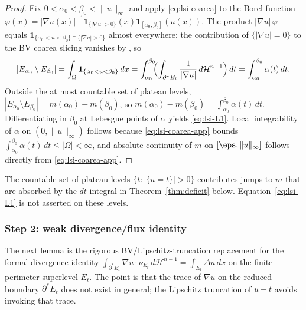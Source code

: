 \begin{proof}
Fix $0<\alpha_{0}<\beta_{0}<\|u\|_{\infty}$ and apply
\eqref{eq:lsi-coarea} to the Borel function
$\varphi(x)=|\nabla u(x)|^{-1}\mathbf 1_{\{|\nabla u|>0\}}(x)
\mathbf 1_{[\alpha_{0},\beta_{0}]}(u(x))$. The product
$|\nabla u|\,\varphi$ equals $\mathbf 1_{\{\alpha_{0}<u<\beta_{0}\}\cap\{|\nabla
u|>0\}}$ almost everywhere; the contribution of $\{|\nabla u|=0\}$ to
the BV coarea slicing vanishes by \cite[3.40(b)]{AFP2000}, so
\begin{equation}\label{eq:lsi-coarea-app}
   |E_{\alpha_{0}}\setminus E_{\beta_{0}}|
   =\int_{\Omega}\mathbf 1_{\{\alpha_{0}<u<\beta_{0}\}}\,dx
   =\int_{\alpha_{0}}^{\beta_{0}}\!\!\Bigl(\int_{\partial^{*}E_{t}}
     \frac{1}{|\nabla u|}\,d\mathcal H^{n-1}\Bigr)\,dt
   =\int_{\alpha_{0}}^{\beta_{0}}\alpha(t)\,dt.
\end{equation}
Outside the at most countable set of plateau levels,
$|E_{\alpha_{0}}\setminus E_{\beta_{0}}|=m(\alpha_{0})-m(\beta_{0})$, so
$m(\alpha_{0})-m(\beta_{0})=\int_{\alpha_{0}}^{\beta_{0}}\alpha(t)\,dt$.
Differentiating in $\beta_{0}$ at Lebesgue points of $\alpha$ yields
\eqref{eq:lsi-L1}. Local integrability of $\alpha$ on $(0,\|u\|_{\infty})$
follows because \eqref{eq:lsi-coarea-app} bounds
$\int_{\alpha_{0}}^{\beta_{0}}\alpha(t)\,dt\le |\Omega|<\infty$, and
absolute continuity of $m$ on $[\eps,\|u\|_{\infty}]$ follows directly
from \eqref{eq:lsi-coarea-app}.
\end{proof}

\begin{remark}\label{rem:plateaus}
The countable set of plateau levels $\{t:|\{u=t\}|>0\}$ contributes
jumps to $m$ that are absorbed by the $dt$-integral in
Theorem~\ref{thm:deficit} below. Equation~\eqref{eq:lsi-L1} is not
asserted on these levels.
\end{remark}

\subsubsection{Step 2: weak divergence/flux identity}
\label{sssec:lsi-flux}

The next lemma is the rigorous BV/Lipschitz-truncation replacement for
the formal divergence identity
$\int_{\partial^{*}E_{t}}\nabla u\cdot\nu_{E_{t}}\,d\mathcal H^{n-1}
=\int_{E_{t}}\Delta u\,dx$ on the finite-perimeter superlevel $E_{t}$.
The point is that the trace of $\nabla u$ on the reduced boundary
$\partial^{*}E_{t}$ does not exist in general; the Lipschitz truncation
of $u-t$ avoids invoking that trace.


